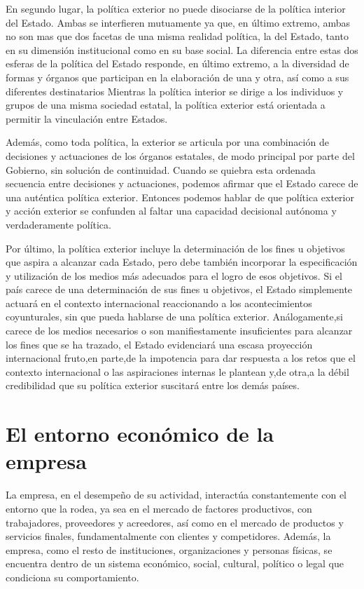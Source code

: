 \documentclass[
]{krantz}
\begin{document}
En segundo lugar, la política exterior no puede disociarse de la política interior del Estado. Ambas se interfieren mutuamente ya que, en último extremo, ambas no son mas que dos facetas de una misma realidad política, la del Estado, tanto en su dimensión institucional como en su base social. La diferencia entre estas dos esferas de la política del Estado responde, en último extremo, a la diversidad de formas y órganos que participan en la elaboración de una y otra, así como a sus diferentes destinatarios Mientras la política interior se dirige a los individuos y grupos de una misma sociedad estatal, la política exterior está orientada a permitir la vinculación entre Estados.

Además, como toda política, la exterior se articula por una combinación de decisiones y actuaciones de los órganos estatales, de modo principal por parte del Gobierno, sin solución de continuidad. Cuando se quiebra esta ordenada secuencia entre decisiones y actuaciones, podemos afirmar que el Estado carece de una auténtica política exterior. Entonces podemos hablar de que política exterior y acción exterior se confunden al faltar una capacidad decisional autónoma y verdaderamente política.

Por último, la política exterior incluye la determinación de los fines u objetivos que aspira a alcanzar cada Estado, pero debe también incorporar la especificación y utilización de los medios más adecuados para el logro de esos objetivos. Si el país carece de una determinación de sus fines u objetivos, el Estado simplemente actuará en el contexto internacional reaccionando a los acontecimientos coyunturales, sin que pueda hablarse de una política exterior. Análogamente,si carece de los medios necesarios o son manifiestamente insuficientes para alcanzar los fines que se ha trazado, el Estado evidenciará una escasa proyección internacional fruto,en parte,de la impotencia para dar respuesta a los retos que el contexto internacional o las aspiraciones internas le plantean y,de otra,a la débil credibilidad que su política exterior suscitará entre los demás países.

\hypertarget{el-entorno-econuxf3mico-de-la-empresa}{%
\chapter{El entorno económico de la empresa}\label{el-entorno-econuxf3mico-de-la-empresa}}

La empresa, en el desempeño de su actividad, interactúa constantemente con el entorno que la rodea, ya sea en el mercado de factores productivos, con trabajadores, proveedores y acreedores, así como en el mercado de productos y servicios finales, fundamentalmente con clientes y competidores. Además, la empresa, como el resto de instituciones, organizaciones y personas físicas, se encuentra dentro de un sistema económico, social, cultural, político o legal que condiciona su comportamiento.
\end{document}

